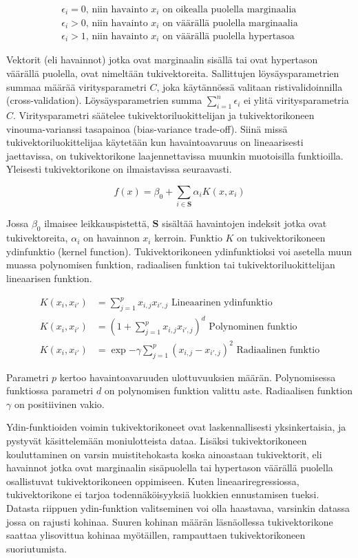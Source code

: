 \documentclass[finnish,twoside,openright]{HYgraduMLDS}
\begin{document}
\begin{gather}
    \epsilon_i = 0\text{, niin havainto $x_i$ on oikealla puolella marginaalia}\\
    \epsilon_i > 0\text{, niin havainto $x_i$ on väärällä puolella marginaalia}\\
    \epsilon_i > 1\text{, niin havainto $x_i$ on väärällä puolella hypertasoa}
\end{gather}

Vektorit (eli havainnot) jotka ovat marginaalin sisällä tai ovat hypertason väärällä puolella, ovat nimeltään tukivektoreita. Sallittujen löysäysparametrien summaa määrää viritysparametri $C$, joka käytännössä valitaan ristivalidoinnilla (cross-validation). Löysäysparametrien summa $\sum^n_{i=1} \epsilon_i$ ei ylitä viritysparametria $C$. Viritysparametri säätelee tukivektoriluokittelijan ja tukivektorikoneen vinouma-varianssi tasapainoa (bias-variance trade-off). Siinä missä tukivektoriluokittelijaa käytetään kun havaintoavaruus on lineaarisesti jaettavissa, on tukivektorikone laajennettavissa muunkin muotoisilla funktioilla. Yleisesti tukivektorikone on ilmaistavissa seuraavasti.

\begin{equation}
    f(x) = \beta_0 + \sum_{i \in \textbf{S}} \alpha_i K(x, x_i)
\end{equation}

Jossa $\beta_0$ ilmaisee leikkauspistettä, $\textbf{S}$ sisältää havaintojen indeksit jotka ovat tukivektoreita, $\alpha_i$ on havainnon $x_i$ kerroin. Funktio $K$ on tukivektorikoneen ydinfunktio (kernel function). Tukivektorikoneen ydinfunktioksi voi asetella muun muassa polynomisen funktion, radiaalisen funktion tai tukivektoriluokittelijan lineaarisen funktion.

\begin{align}
    K(x_i, x_{i'}) &= \sum^p_{j=1} x_{i, j} x_{i', j} \text{ Lineaarinen ydinfunktio}\\
    K(x_i, x_{i'}) &= (1 + \sum^p_{j=1} x_{i, j} x_{i', j} )^d \text{ Polynominen funktio}\\
    K(x_i, x_{i'}) &= \exp{-\gamma \sum^p_{j=1}( x_{i, j} - x_{i', j} )^2} \text{ Radiaalinen funktio}
\end{align}

Parametri $p$ kertoo havaintoavaruuden ulottuvuuksien määrän. Polynomisessa funktiossa parametri $d$ on polynomisen funktion valittu aste. Radiaalisen funktion $\gamma$ on positiivinen vakio.

Ydin-funktioiden voimin tukivektorikoneet ovat laskennallisesti yksinkertaisia, ja pystyvät käsittelemään moniulotteista dataa. Lisäksi tukivektorikoneen kouluttaminen on varsin muistitehokasta koska ainoastaan tukivektorit, eli havainnot jotka ovat marginaalin sisäpuolella tai hypertason väärällä puolella osallistuvat tukivektorikoneen oppimiseen. Kuten lineaariregressiossa, tukivektorikone ei tarjoa todennäköisyyksiä luokkien ennustamisen tueksi. Datasta riippuen ydin-funktion valitseminen voi olla haastavaa, varsinkin datassa jossa on rajusti kohinaa. Suuren kohinan määrän läsnäollessa tukivektorikone saattaa ylisovittua kohinaa myötäillen, rampauttaen tukivektorikoneen suoriutumista.
\end{document}
